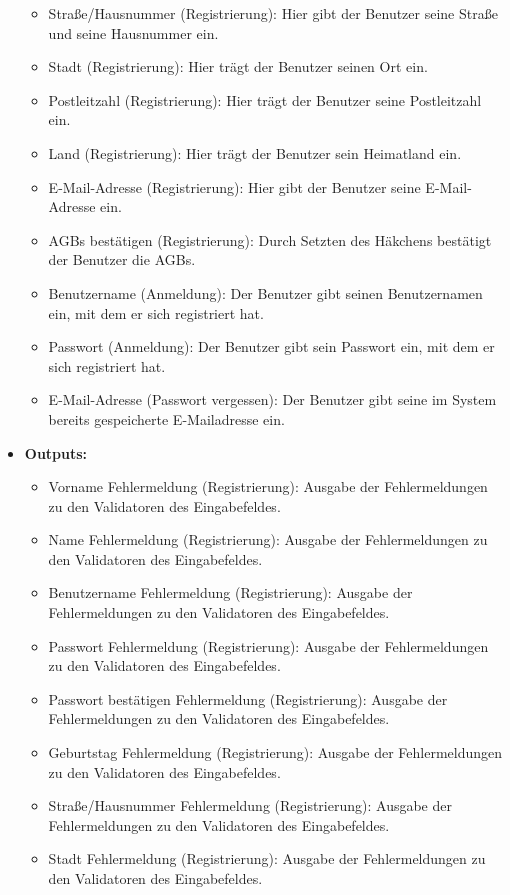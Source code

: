 \begin{itemize}
\begin{itemize}
							\item Straße/Hausnummer (Registrierung): Hier gibt der Benutzer seine Straße und seine Hausnummer ein.
							\item Stadt (Registrierung): Hier trägt der Benutzer seinen Ort ein.
							\item Postleitzahl (Registrierung): Hier trägt der Benutzer seine Postleitzahl ein.
							\item Land (Registrierung): Hier trägt der Benutzer sein Heimatland ein.
							\item E-Mail-Adresse (Registrierung): Hier gibt der Benutzer seine E-Mail-Adresse ein.
							\item AGBs bestätigen (Registrierung): Durch Setzten des Häkchens bestätigt der Benutzer die AGBs. 
							\item Benutzername (Anmeldung): Der Benutzer gibt seinen Benutzernamen ein, mit dem er sich registriert hat.
							\item Passwort (Anmeldung): Der Benutzer gibt sein Passwort ein, mit dem er sich registriert hat.
							\item E-Mail-Adresse (Passwort vergessen): Der Benutzer gibt seine im System bereits gespeicherte E-Mailadresse ein.
						\end{itemize}
					\item \textbf{Outputs:} 
						\begin{itemize}
							\item Vorname Fehlermeldung (Registrierung): Ausgabe der Fehlermeldungen zu den Validatoren des Eingabefeldes.
							\item Name Fehlermeldung (Registrierung): Ausgabe der Fehlermeldungen zu den Validatoren des Eingabefeldes.
							\item Benutzername Fehlermeldung (Registrierung): Ausgabe der Fehlermeldungen zu den Validatoren des Eingabefeldes.
							\item Passwort Fehlermeldung (Registrierung): Ausgabe der Fehlermeldungen zu den Validatoren des Eingabefeldes.
							\item Passwort bestätigen Fehlermeldung (Registrierung): Ausgabe der Fehlermeldungen zu den Validatoren des Eingabefeldes.
							\item Geburtstag Fehlermeldung (Registrierung): Ausgabe der Fehlermeldungen zu den Validatoren des Eingabefeldes.
							\item Straße/Hausnummer Fehlermeldung (Registrierung): Ausgabe der Fehlermeldungen zu den Validatoren des Eingabefeldes.
							\item Stadt Fehlermeldung (Registrierung): Ausgabe der Fehlermeldungen zu den Validatoren des Eingabefeldes.

\end{itemize}
\end{itemize}
